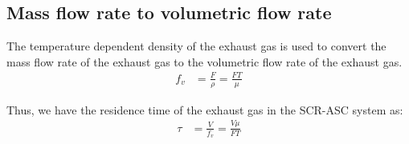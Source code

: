 \subsection{Mass flow rate to volumetric flow rate}
The temperature dependent density of the exhaust gas is used to convert the mass
flow rate of the exhaust gas to the volumetric flow rate of the exhaust gas.
\begin{align}
    f_v &= \frac{F}{\rho} = \frac{FT}{\mu}
\end{align}

Thus, we have the residence time of the exhaust gas in the SCR-ASC system as:
\begin{align}
    \tau &= \frac{V}{f_v} = \frac{V \mu}{FT}
\end{align}
